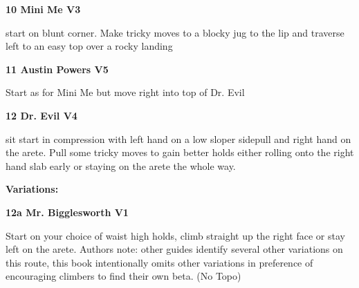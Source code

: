 \begin{multicols}{2}
					\begin{minipage}{\linewidth}	
					\label{rt:Mini Me}
\colorbox{green!20}{
\parbox{0.95\textwidth}{
\textbf{
10 Mini Me V3  
}
}
}

					\begin{adjustwidth}{0.5cm}{}				
					start on blunt corner. Make tricky moves to a blocky jug to the lip and traverse left to an easy top over a rocky landing
					\end{adjustwidth}
					\end{minipage}
					\begin{minipage}{\linewidth}	
					\label{rt:Austin Powers}
\colorbox{RoyalBlue!20}{
\parbox{0.95\textwidth}{
\textbf{
11 Austin Powers V5    
}
}
}

					\begin{adjustwidth}{0.5cm}{}				
					Start as for Mini Me but move right into top of Dr. Evil
					\end{adjustwidth}
					\end{minipage}

					\begin{minipage}{\linewidth}	
					\label{rt:Dr. Evil}
\colorbox{RoyalBlue!20}{
\parbox{0.95\textwidth}{
\textbf{
12 Dr. Evil V4    
}
}
}

					\begin{adjustwidth}{0.5cm}{}				
					sit start in compression with left hand on a low sloper sidepull and right hand on the arete. Pull some tricky moves to gain better holds either rolling onto the right hand slab early or staying on the arete the whole way.
					\end{adjustwidth}
					\end{minipage}
						\begin{adjustwidth}{0.5cm}{}				
						\textbf{Variations:} \newline
							\begin{minipage}{\linewidth}	
							\label{vr:Mr. Bigglesworth}
\colorbox{green!20}{
\parbox{0.95\textwidth}{
\textbf{
12a Mr. Bigglesworth V1    
}
}
}

							\begin{adjustwidth}{0.5cm}{}				
							Start on your choice of waist high holds, climb straight up the right face or stay left on the arete. Authors note: other guides identify several other variations on this route, this book intentionally omits other variations in preference of encouraging climbers to find their own beta.
								\newline (No Topo) 
							\end{adjustwidth}
							\end{minipage}
						\end{adjustwidth}

\end{multicols}
